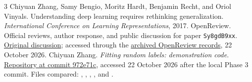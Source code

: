 \documentclass[11pt]{article}
\begin{document}
\begin{thebibliography}{3}
Chiyuan Zhang, Samy Bengio, Moritz Hardt, Benjamin Recht, and Oriol Vinyals.
\newblock Understanding deep learning requires rethinking generalization.
\newblock \emph{International Conference on Learning Representations}, 2017.
OpenReview. Official reviews, author response, and public discussion for paper \texttt{Sy8gdB9xx}.
\newblock \href{https://openreview.net/forum?id=Sy8gdB9xx}{Original discussion}; accessed through the
\href{https://github.com/xcfcode/openreview_spider/blob/b232dbcbbee6a7a39415c2ea046058e9dcd82e1e/res/Sy8gdB9xx.json}{archived OpenReview records}, 22 October 2026.
Chiyuan Zhang. \emph{Fitting random labels: demonstration code}.
\newblock \href{https://github.com/pluskid/fitting-random-labels/tree/972e71c94442fc99baeb5baebee8c95e5767963b}{Repository at commit 972e71c}, accessed 22 October 2026 after the local Phase 3 commit.
\newblock Files compared: , , , , and .
\end{thebibliography}
\end{document}
